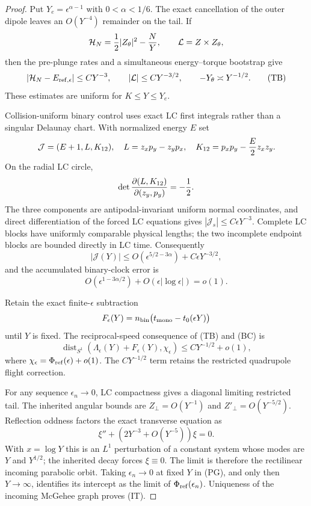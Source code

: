 \documentclass[11pt]{article}
\begin{document}
\begin{proof}
Put $Y_e=\epsilon^{\alpha-1}$ with $0<\alpha<1/6$. The exact cancellation of
the outer dipole leaves an $O(Y^{-4})$ remainder on the tail. If
\[
\mathcal H_N={1\over2}|Z_\theta|^2-{N\over Y},
\qquad \mathcal L=Z\times Z_\theta ,
\]
then the pre-plunge rates and a simultaneous energy--torque bootstrap give
\[
|\mathcal H_N-E_{\rm ref,\epsilon}|\le CY^{-3},\qquad
|\mathcal L|\le CY^{-3/2},\qquad
-Y_\theta\asymp Y^{-1/2}.
\tag{TB}
\]
These estimates are uniform for $K\le Y\le Y_e$.

Collision-uniform binary control uses exact LC first integrals rather than a
singular Delaunay chart. With normalized energy $E$ set
\[
\mathcal J=(E+1,L,K_{12}),\quad
L=z_xp_y-z_yp_x,\quad
K_{12}=p_xp_y-{E\over2}z_xz_y .
\]
On the radial LC circle,
\[
\det{\partial(L,K_{12})\over\partial(z_y,p_y)}=-{1\over2}.
\]
The three components are antipodal-invariant uniform normal coordinates, and
direct differentiation of the forced LC equations gives
$|\mathcal J_s|\le C\epsilon Y^{-3}$. Complete LC blocks have uniformly
comparable physical lengths; the two incomplete endpoint blocks are bounded
directly in LC time. Consequently
\[
|\mathcal J(Y)|\le
O(\epsilon^{5/2-3\alpha})+C\epsilon Y^{-3/2},
\]
and the accumulated binary-clock error is
\[
O(\epsilon^{1-3\alpha/2})
+O(\epsilon|\log\epsilon|)=o(1).
\tag{BC}
\]

Retain the exact finite-$\epsilon$ subtraction
\[
F_\epsilon(Y)=n_{\rm bin}
\bigl(t_{\rm mono}-t_0(\epsilon Y)\bigr)
\]
until $Y$ is fixed. The reciprocal-speed consequence of (TB) and (BC) is
\[
\operatorname{dist}_{S^1}\!\left(
\Lambda_\epsilon(Y)+F_\epsilon(Y),\chi_\epsilon\right)
\le CY^{-1/2}+o(1),
\tag{PG}
\]
where $\chi_\epsilon=\Phi_{\rm ref}(\epsilon)+o(1)$. The
$CY^{-1/2}$ term retains the restricted quadrupole flight correction.

For any sequence $\epsilon_n\to0$, LC compactness gives a diagonal limiting
restricted tail. The inherited angular bounds are
$Z_\perp=O(Y^{-1})$ and $Z'_\perp=O(Y^{-5/2})$. Reflection oddness factors
the exact transverse equation as
\[
\xi''+\left(2Y^{-3}+O(Y^{-5})\right)\xi=0.
\]
With $x=\log Y$ this is an $L^1$ perturbation of a constant system whose modes
are $Y$ and $Y^{1/2}$; the inherited decay forces $\xi\equiv0$. The limit is
therefore the rectilinear incoming parabolic orbit. Taking
$\epsilon_n\to0$ at fixed $Y$ in (PG), and only then $Y\to\infty$, identifies
its intercept as the limit of $\Phi_{\rm ref}(\epsilon_n)$. Uniqueness of the
incoming McGehee graph proves (IT).
\end{proof}
\end{document}
